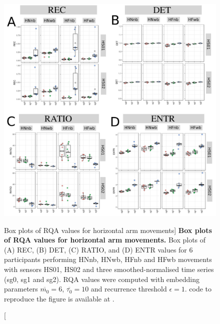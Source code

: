 \begin{figure}
\centering
\includegraphics[width=1.0\textwidth]{fig_5_13}
	\caption
	[Box plots of RQA values for horizontal arm movements]{
	{\bf Box plots of RQA values for horizontal arm movements.}
	Box plots of (A) REC, (B) DET, (C) RATIO, and (D) ENTR values 
	for 6 participants performing HNnb, HNwb, HFnb and HFwb movements
	with sensors HS01, HS02 and three smoothed-normalised  
	time series (sg0, sg1 and sg2).
	RQA values were computed with 
	embedding parameters $\overline{m_0}=6$, $\overline{\tau_0}=10$ and 
	recurrence threshold $\epsilon=1$.
	\R code to reproduce the figure is available at 
	.
        }
    \label{fig:BPRQAH}
\end{figure}

